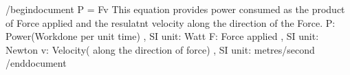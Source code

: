 /begindocument
P = Fv
This equation provides power consumed as the product of Force applied and the resulatnt velocity along the direction of the Force.
P: Power(Workdone per unit time) , SI unit: Watt
F: Force applied , SI unit: Newton
v: Velocity( along the direction of force) , SI unit: metres/second
/enddocument
